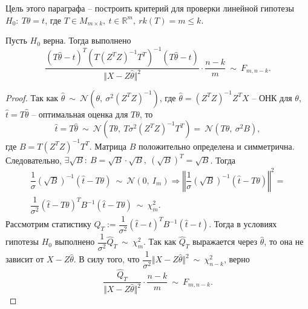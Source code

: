 Цель этого параграфа -- построить критерий для проверки линейной гипотезы $\displaystyle H_{0} :\ T\theta =t$, где $\displaystyle T\in M_{m\times k} ,\ t\in \mathbb{R}^{m} ,\ rk( T) =m\leqslant k$.
\begin{proposition}
    Пусть $\displaystyle H_{0}$ верна. Тогда выполнено
    \begin{equation*}
        \dfrac{( T\hat{\theta } -t)^{T}\left( T\left( Z^{T} Z\right)^{-1} T^{T}\right)^{-1}( T\hat{\theta } -t)}{\Vert X-Z\hat{\theta }\Vert ^{2}} \cdotp \dfrac{n-k}{m} \ \sim \ F_{m,n-k} .
    \end{equation*}
\end{proposition}
\begin{proof}
    Так как $\displaystyle \hat{\theta } \ \sim \ \mathcal{N}\left( \theta ,\ \sigma ^{2}\left( Z^{T} Z\right)^{-1}\right)$, где $\displaystyle \hat{\theta } =\left( Z^{T} Z\right)^{-1} Z^{T} X$ -- ОНК для $\displaystyle \theta $, $\displaystyle \hat{t} =T\hat{\theta }$ -- оптимальная оценка для $\displaystyle T\theta $, то 
    \begin{equation*}
        \hat{t} =T\hat{\theta } \ \sim \ \mathcal{N}\left( T\theta ,\ T\sigma ^{2}\left( Z^{T} Z\right)^{-1} T^{T}\right) =\ \mathcal{N}\left( T\theta ,\ \sigma ^{2} B\right) ,
    \end{equation*}
    где $\displaystyle B=T\left( Z^{T} Z\right)^{-1} T^{T}$. Матрица $\displaystyle B$ положительно определена и симметрична. Следовательно, $\displaystyle \exists \sqrt{B} :\ B=\sqrt{B} \cdotp \sqrt{B} ,\ \left(\sqrt{B}\right)^{T} =\sqrt{B}$. Тогда
    \begin{gather*}
        \dfrac{1}{\sigma }\left(\sqrt{B}\right)^{-1}(\hat{t} -T\theta ) \ \sim \ \mathcal{N}( 0,\ I_{m}) \Rightarrow \left\Vert \dfrac{1}{\sigma }\left(\sqrt{B}\right)^{-1}(\hat{t} -T\theta )\right\Vert ^{2} =\\
        \dfrac{1}{\sigma ^{2}}(\hat{t} -T\theta )^{T} B^{-1}(\hat{t} -T\theta ) \ \sim \ \chi _{m}^{2} .
    \end{gather*}
    Рассмотрим статистику $\displaystyle \hat{Q}_{T} :=\dfrac{1}{\sigma ^{2}}(\hat{t} -t)^{T} B^{-1}(\hat{t} -t)$. Тогда в условиях гипотезы $\displaystyle H_{0}$ выполнено $\displaystyle \dfrac{1}{\sigma ^{2}}\hat{Q}_{T} \ \sim \ \chi _{m}^{2}$. Так как $\displaystyle \hat{Q}_{T}$ выражается через $\displaystyle \hat{\theta }$, то она не зависит от $\displaystyle X-Z\hat{\theta }$. В силу того, что $\displaystyle \dfrac{1}{\sigma ^{2}}\Vert X-Z\hat{\theta }\Vert ^{2} \ \sim \ \chi _{n-k}^{2}$, верно
    \begin{equation*}
        \dfrac{\hat{Q}_{T}}{\Vert X-Z\hat{\theta }\Vert ^{2}} \cdotp \dfrac{n-k}{m} \ \sim \ F_{m,n-k} .
    \end{equation*}
\end{proof}

